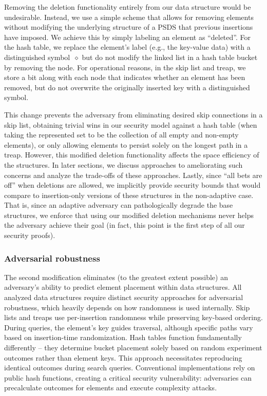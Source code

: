 Removing the deletion functionality entirely from our data structure would be undesirable. Instead, we use a simple scheme that allows for removing elements without modifying the underlying structure of a PSDS that previous insertions have imposed. We achieve this by simply labeling an element as ``deleted''. For the hash table, we replace the element's label (e.g., the key-value data) with a distinguished symbol~$\diamond$ but do not modify the linked list in a hash table bucket by removing the node. For operational reasons, in the skip list and treap, we store a bit along with each node that indicates whether an element has been removed, but do not overwrite the originally inserted key with a distinguished symbol. 

This change prevents the adversary from eliminating desired skip connections in a skip list, obtaining trivial wins in our security model against a hash table (when taking the represented set to be the collection of all empty and non-empty elements), or only allowing elements to persist solely on the longest path in a treap. However, this modified deletion functionality affects the space efficiency of the structures. In later sections, we discuss approaches to ameliorating such concerns and analyze the trade-offs of these approaches. Lastly, since ``all bets are off'' when deletions are allowed, we implicitly provide security bounds that would compare to insertion-only versions of these structures in the non-adaptive case. That is, since an adaptive adversary can pathologically degrade the base structures, we enforce that using our modified deletion mechanisms never helps the adversary achieve their goal (in fact, this point is the first step of all our security proofs). 

\subsubsection{Adversarial robustness}
The second modification eliminates (to the greatest extent possible) an adversary's ability to predict element placement within data structures. All analyzed data structures require distinct security approaches for adversarial robustness, which heavily depends on how randomness is used internally. Skip lists and treaps use per-insertion randomness while preserving key-based ordering. During queries, the element's key guides traversal, although specific paths vary based on insertion-time randomization. Hash tables function fundamentally differently -- they determine bucket placement solely based on random experiment outcomes rather than element keys. This approach necessitates reproducing identical outcomes during search queries. Conventional implementations rely on public hash functions, creating a critical security vulnerability: adversaries can precalculate outcomes for elements and execute complexity attacks.

